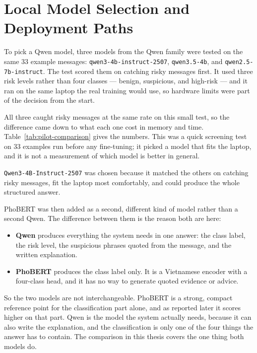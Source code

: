 \section{Local Model Selection and Deployment Paths}

To pick a Qwen model, three models from the Qwen family \cite{qwen2025} were tested on the same 33 example messages: \texttt{qwen3-4b-instruct-2507}, \texttt{qwen3.5-4b}, and \texttt{qwen2.5-7b-instruct}. The test scored them on catching risky messages first. It used three risk levels rather than four classes --- benign, suspicious, and high-risk --- and it ran on the same laptop the real training would use, so hardware limits were part of the decision from the start.

All three caught risky messages at the same rate on this small test, so the difference came down to what each one cost in memory and time. Table~\ref{tab:pilot-comparison} gives the numbers. This was a quick screening test on 33 examples run before any fine-tuning; it picked a model that fits the laptop, and it is not a measurement of which model is better in general.



\texttt{Qwen3-4B-Instruct-2507} was chosen because it matched the others on catching risky messages, fit the laptop most comfortably, and could produce the whole structured answer.

\label{sec:qwen-vs-phobert}
PhoBERT \cite{nguyen2020phobert} was then added as a second, different kind of model rather than a second Qwen. The difference between them is the reason both are here:

\begin{itemize}\itemsep2pt
\item \textbf{Qwen} produces everything the system needs in one answer: the class label, the risk level, the suspicious phrases quoted from the message, and the written explanation.
\item \textbf{PhoBERT} produces the class label only. It is a Vietnamese encoder with a four-class head, and it has no way to generate quoted evidence or advice.
\end{itemize}

\noindent So the two models are not interchangeable. PhoBERT is a strong, compact reference point for the classification part alone, and as reported later it scores higher on that part. Qwen is the model the system actually needs, because it can also write the explanation, and the classification is only one of the four things the answer has to contain. The comparison in this thesis covers the one thing both models do.

